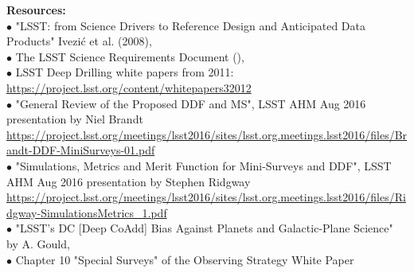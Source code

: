 \documentclass[DM,lsstdraft,toc]{lsstdoc}
\begin{document}
\noindent \textbf{Resources:} \\
$\bullet$ "LSST: from Science Drivers to Reference Design and Anticipated Data Products" Ivezi\'{c} et al. (2008), \citep{2008arXiv0805.2366I} \\
$\bullet$ The LSST Science Requirements Document (\SRD),  \\
$\bullet$ LSST Deep Drilling white papers from 2011: \url{https://project.lsst.org/content/whitepapers32012} \\
$\bullet$ "General Review of the Proposed DDF and MS", LSST AHM Aug 2016 presentation by Niel Brandt \url{https://project.lsst.org/meetings/lsst2016/sites/lsst.org.meetings.lsst2016/files/Brandt-DDF-MiniSurveys-01.pdf} \\
$\bullet$ "Simulations, Metrics and Merit Function for Mini-Surveys and DDF", LSST AHM Aug 2016 presentation by Stephen Ridgway \url{https://project.lsst.org/meetings/lsst2016/sites/lsst.org.meetings.lsst2016/files/Ridgway-SimulationsMetrics_1.pdf} \\
$\bullet$ "LSST's DC [Deep CoAdd] Bias Against Planets and Galactic-Plane Science" by A. Gould, \citep{2013arXiv1304.3455G} \\
$\bullet$ Chapter 10 "Special Surveys" of the Observing Strategy White Paper \citep{2017arXiv170804058L}
\end{document}
